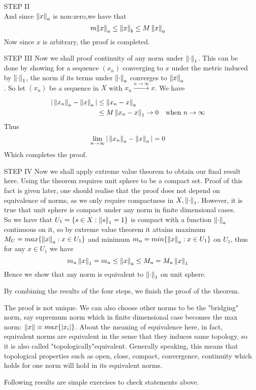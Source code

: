 \begin{theorem}
\begin{pf}{STEP II}{}
$$		$$
		And since ${\left\|{x}\right\|_a}$ is non-zero,we have that
		$$
			m{\left\|{x}\right\|_a}\leq \left\|{x}\right\|_b\leq M\left\|{x}\right\|_a
		$$
		Now since $x$ is arbitrary, the proof is completed.	
	\end{pf}
	\begin{pf}{STEP III}{}
		Now we shall proof continuity of any norm under $\left\|{\cdot}\right\| _1$. This can be done by showing for a sequence $(x_n)$ converging to $x$ under the metric induced by $\left\|{\cdot}\right\|_1$, the norm if its terms under $\left\|{\cdot}\right\|_a$ converges to $\left\|{x}\right\|_a$\\. So let $(x_n)$ be a sequence in $X$ with $x_n\xrightarrow[]{n\to \infty}x$. We have
		\begin{equation}
			\begin{split}\nonumber
				|\left\|{x_n}\right\|_a-\left\|{x}\right\|_a|&\leq\left\|{x_n-x}\right\|_a\\
				&\leq M\left\|{x_n-x}\right\|_1\to0\quad \text{when}\,\,n\to\infty
			\end{split}
		\end{equation}
		Thus
		$$
			\lim_{n\to\infty}|\left\|{x_n}\right\|_a-\left\|{x}\right\|_a|=0
		$$
		Which completes the proof.
	\end{pf}
\begin{pf}{STEP IV}{}
	Now we shall apply extreme value theorem to obtain our final result here. Using the theorem requires unit sphere to be a compact set. Proof of this fact is given later, one should realise that the proof does not depend on equivalence of norms, as we only require compactness in $X,\left\|{\cdot}\right\|_1$. However, it is true that unit sphere is compact under any norm in finite dimensional cases.\\
	So we have that $U_1=\{s\in X:\left\|{s}\right\|_1=1\}$ is compact with  a  function $\left\|{\cdot}\right\|_a$ continuous on it, so by extreme value theorem it attains maximum $M_U=max\{\left\|{x}\right\|_a:x\in U_1\}$ and minimum $m_u=min\{\left\|{x}\right\|_a:x\in U_1\}$ on $U_1$, thus for any $x\in U_1$ we have
	$$
		m_u \left\|{x}\right\|_1=m_u\leq\left\|{x}\right\|_a\leq M_u=M_u \left\|{x}\right\|_1
	$$
	Hence we show that any norm is equivalent to $\left\|{\cdot}\right\|_1$ on unit sphere.
\end{pf}
By combining the results of the four steps, we finish the proof of the theorem.
\end{theorem}

\begin{remark}\rm\nextline
	The proof is not unique. We can also choose other norms to be the "bridging" norm, say supremum norm which in finite dimensional case becomes the max norm: $\left\|{x}\right\|\equiv max\{|x_i|\}$. About the meaning of equivalence here, in fact, equivalent norms are equivalent in the sense that they induces same topology, so it is also called "topologically"equivalent. Generally speaking, this means that topological properties such as open, close, compact, convergence, continuity which holds for one norm will hold in its equivalent norms.
\end{remark}
Following results are simple exercises to check statements above.


